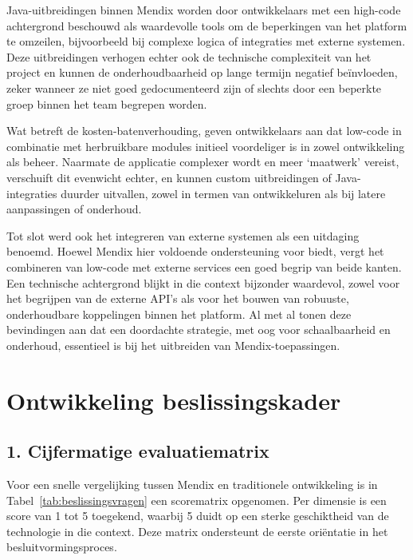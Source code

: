 Java-uitbreidingen binnen Mendix worden door ontwikkelaars met een high-code achtergrond beschouwd als waardevolle tools om de beperkingen van het platform te omzeilen, bijvoorbeeld bij complexe logica of integraties met externe systemen. Deze uitbreidingen verhogen echter ook de technische complexiteit van het project en kunnen de onderhoudbaarheid op lange termijn negatief beïnvloeden, zeker wanneer ze niet goed gedocumenteerd zijn of slechts door een beperkte groep binnen het team begrepen worden.

Wat betreft de kosten-batenverhouding, geven ontwikkelaars aan dat low-code in combinatie met herbruikbare modules initieel voordeliger is in zowel ontwikkeling als beheer. Naarmate de applicatie complexer wordt en meer ‘maatwerk’ vereist, verschuift dit evenwicht echter, en kunnen custom uitbreidingen of Java-integraties duurder uitvallen, zowel in termen van ontwikkeluren als bij latere aanpassingen of onderhoud.

Tot slot werd ook het integreren van externe systemen als een uitdaging benoemd. Hoewel Mendix hier voldoende ondersteuning voor biedt, vergt het combineren van low-code met externe services een goed begrip van beide kanten. Een technische achtergrond blijkt in die context bijzonder waardevol, zowel voor het begrijpen van de externe API’s als voor het bouwen van robuuste, onderhoudbare koppelingen binnen het platform. Al met al tonen deze bevindingen aan dat een doordachte strategie, met oog voor schaalbaarheid en onderhoud, essentieel is bij het uitbreiden van Mendix-toepassingen.

\section{Ontwikkeling beslissingskader}

\subsection{1. Cijfermatige evaluatiematrix}
Voor een snelle vergelijking tussen Mendix en traditionele ontwikkeling is in Tabel~\ref{tab:beslissingsvragen} een scorematrix opgenomen. Per dimensie is een score van 1 tot 5 toegekend, waarbij 5 duidt op een sterke geschiktheid van de technologie in die context. Deze matrix ondersteunt de eerste oriëntatie in het besluitvormingsproces.

